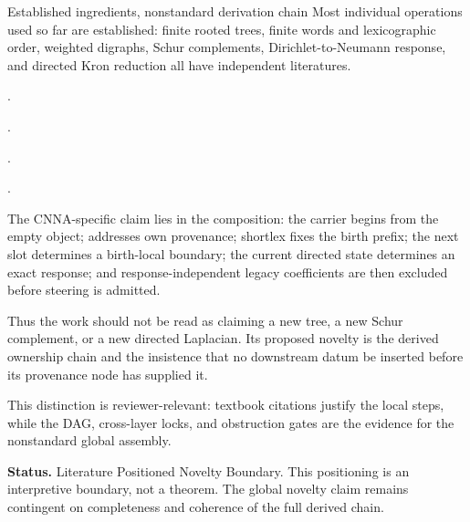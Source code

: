 \begin{cnnaInfoBox}{Established ingredients, nonstandard derivation chain}
\label{box:o001-novelty-boundary-infobox}
Most individual operations used so far are established: finite rooted trees, finite words and lexicographic order, weighted digraphs, Schur complements, Dirichlet-to-Neumann response, and directed Kron reduction all have independent literatures.

\cite[Ch.~1]{Diestel2025GraphTheory}.

\cite[Ch.~1]{Lothaire1997CombinatoricsWords}.

\cite[Basic Properties, pp.~17--46]{Zhang2005SchurComplement}.

\cite[Definition~3.2; Lemmas~3.3--3.4; Theorem~3.9]{SugiyamaSato2023DirectedKron}.

The CNNA-specific claim lies in the composition: the carrier begins from the empty object; addresses own provenance; shortlex fixes the birth prefix; the next slot determines a birth-local boundary; the current directed state determines an exact response; and response-independent legacy coefficients are then excluded before steering is admitted.

Thus the work should not be read as claiming a new tree, a new Schur complement, or a new directed Laplacian.  Its proposed novelty is the derived ownership chain and the insistence that no downstream datum be inserted before its provenance node has supplied it.

This distinction is reviewer-relevant: textbook citations justify the local steps, while the DAG, cross-layer locks, and obstruction gates are the evidence for the nonstandard global assembly.

\textbf{Status.} Literature Positioned Novelty Boundary. This positioning is an interpretive boundary, not a theorem. The global novelty claim remains contingent on completeness and coherence of the full derived chain.
\end{cnnaInfoBox}
